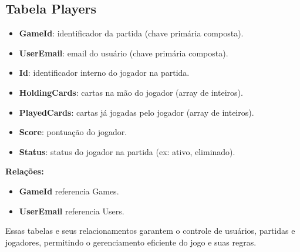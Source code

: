 \subsection{Tabela Players}
\begin{itemize}
    \item \textbf{GameId}: identificador da partida (chave primária composta).
    \item \textbf{UserEmail}: email do usuário (chave primária composta).
    \item \textbf{Id}: identificador interno do jogador na partida.
    \item \textbf{HoldingCards}: cartas na mão do jogador (array de inteiros).
    \item \textbf{PlayedCards}: cartas já jogadas pelo jogador (array de inteiros).
    \item \textbf{Score}: pontuação do jogador.
    \item \textbf{Status}: status do jogador na partida (ex: ativo, eliminado).
\end{itemize}
\textbf{Relações:}
\begin{itemize}
    \item \textbf{GameId} referencia Games.
    \item \textbf{UserEmail} referencia Users.
\end{itemize}

Essas tabelas e seus relacionamentos garantem o controle de usuários, partidas e jogadores, permitindo o gerenciamento eficiente do jogo e suas regras.

